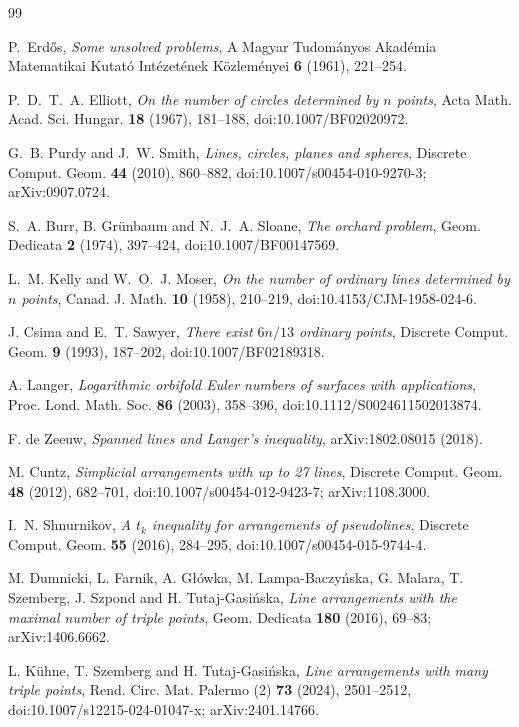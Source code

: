 \begin{thebibliography}{99}

P.~Erd\H{o}s,
\emph{Some unsolved problems},
A Magyar Tudom\'anyos Akad\'emia Matematikai Kutat\'o Int\'ezet\'enek K\"ozlem\'enyei \textbf{6} (1961), 221--254.

P.~D.~T.~A. Elliott,
\emph{On the number of circles determined by $n$ points},
Acta Math. Acad. Sci. Hungar. \textbf{18} (1967), 181--188,
doi:10.1007/BF02020972.

G.~B. Purdy and J.~W. Smith,
\emph{Lines, circles, planes and spheres},
Discrete Comput. Geom. \textbf{44} (2010), 860--882,
doi:10.1007/s00454-010-9270-3; arXiv:0907.0724.

S.~A. Burr, B. Gr\"unbaum and N.~J.~A. Sloane,
\emph{The orchard problem},
Geom. Dedicata \textbf{2} (1974), 397--424,
doi:10.1007/BF00147569.

L.~M. Kelly and W.~O.~J. Moser,
\emph{On the number of ordinary lines determined by $n$ points},
Canad. J. Math. \textbf{10} (1958), 210--219,
doi:10.4153/CJM-1958-024-6.

J. Csima and E.~T. Sawyer,
\emph{There exist $6n/13$ ordinary points},
Discrete Comput. Geom. \textbf{9} (1993), 187--202,
doi:10.1007/BF02189318.

A. Langer,
\emph{Logarithmic orbifold Euler numbers of surfaces with applications},
Proc. Lond. Math. Soc. \textbf{86} (2003), 358--396,
doi:10.1112/S0024611502013874.

F. de Zeeuw,
\emph{Spanned lines and Langer's inequality},
arXiv:1802.08015 (2018).

M. Cuntz,
\emph{Simplicial arrangements with up to 27 lines},
Discrete Comput. Geom. \textbf{48} (2012), 682--701,
doi:10.1007/s00454-012-9423-7; arXiv:1108.3000.

I.~N. Shnurnikov,
\emph{A $t_k$ inequality for arrangements of pseudolines},
Discrete Comput. Geom. \textbf{55} (2016), 284--295,
doi:10.1007/s00454-015-9744-4.

M. Dumnicki, L. Farnik, A. G\l{}\'owka, M. Lampa-Baczy\'nska, G. Malara, T. Szemberg, J. Szpond and H. Tutaj-Gasi\'nska,
\emph{Line arrangements with the maximal number of triple points},
Geom. Dedicata \textbf{180} (2016), 69--83; arXiv:1406.6662.

L. K\"uhne, T. Szemberg and H. Tutaj-Gasi\'nska,
\emph{Line arrangements with many triple points},
Rend. Circ. Mat. Palermo (2) \textbf{73} (2024), 2501--2512,
doi:10.1007/s12215-024-01047-x; arXiv:2401.14766.


\end{thebibliography}

